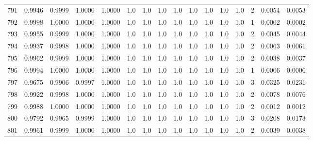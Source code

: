 \begin{tabular}{lrrrrrrrrrrrrrrr}
791 &      0.9946 &  0.9999 &  1.0000 &  1.0000 &     1.0 &     1.0 &     1.0 &     1.0 &     1.0 &     1.0 &      1.0 &        1.0 &      2 &                    0.0054 &                     0.0053 \\
792 &      0.9998 &  1.0000 &  1.0000 &  1.0000 &     1.0 &     1.0 &     1.0 &     1.0 &     1.0 &     1.0 &      1.0 &        1.0 &      1 &                    0.0002 &                     0.0002 \\
793 &      0.9955 &  0.9999 &  1.0000 &  1.0000 &     1.0 &     1.0 &     1.0 &     1.0 &     1.0 &     1.0 &      1.0 &        1.0 &      2 &                    0.0045 &                     0.0044 \\
794 &      0.9937 &  0.9998 &  1.0000 &  1.0000 &     1.0 &     1.0 &     1.0 &     1.0 &     1.0 &     1.0 &      1.0 &        1.0 &      2 &                    0.0063 &                     0.0061 \\
795 &      0.9962 &  0.9999 &  1.0000 &  1.0000 &     1.0 &     1.0 &     1.0 &     1.0 &     1.0 &     1.0 &      1.0 &        1.0 &      2 &                    0.0038 &                     0.0037 \\
796 &      0.9994 &  1.0000 &  1.0000 &  1.0000 &     1.0 &     1.0 &     1.0 &     1.0 &     1.0 &     1.0 &      1.0 &        1.0 &      1 &                    0.0006 &                     0.0006 \\
797 &      0.9675 &  0.9906 &  0.9997 &  1.0000 &     1.0 &     1.0 &     1.0 &     1.0 &     1.0 &     1.0 &      1.0 &        1.0 &      3 &                    0.0325 &                     0.0231 \\
798 &      0.9922 &  0.9998 &  1.0000 &  1.0000 &     1.0 &     1.0 &     1.0 &     1.0 &     1.0 &     1.0 &      1.0 &        1.0 &      2 &                    0.0078 &                     0.0076 \\
799 &      0.9988 &  1.0000 &  1.0000 &  1.0000 &     1.0 &     1.0 &     1.0 &     1.0 &     1.0 &     1.0 &      1.0 &        1.0 &      2 &                    0.0012 &                     0.0012 \\
800 &      0.9792 &  0.9965 &  0.9999 &  1.0000 &     1.0 &     1.0 &     1.0 &     1.0 &     1.0 &     1.0 &      1.0 &        1.0 &      3 &                    0.0208 &                     0.0173 \\
801 &      0.9961 &  0.9999 &  1.0000 &  1.0000 &     1.0 &     1.0 &     1.0 &     1.0 &     1.0 &     1.0 &      1.0 &        1.0 &      2 &                    0.0039 &                     0.0038 \\

\end{tabular}
